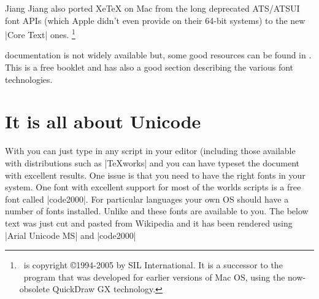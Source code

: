 Jiang Jiang also ported XeTeX on Mac from the long deprecated ATS/ATSUI font APIs (which Apple didn’t even provide on their 64-bit systems) to the new |Core Text| ones.
\footnote{\XeTeX\ is copyright ©1994-2005 by SIL International. It is a successor to the \TeXgX\ program that was developed for earlier versions of Mac OS, using the now-obsolete QuickDraw GX technology.}

\XeTeX documentation is not widely available but, some good resources can be found in \citep{xetexcompanion}. This is a free booklet and has also a good section describing the various font technologies.

\section{It is all about Unicode}

With \XeLaTeX you can just type in any script in your editor (including those available with \tex distributions such as |TeXworks| and you can have \XeLaTeX typeset the document with excellent results. One issue is that you need to have the right fonts in your system. One font with excellent support for most of the worlds scripts is a free font called |code2000|. For particular languages your own OS should have a number of fonts installed. Unlike \tex and \latexe these fonts are available to you. The below text was just cut and pasted from Wikipedia and it has been rendered using |Arial Unicode MS| and |code2000|




